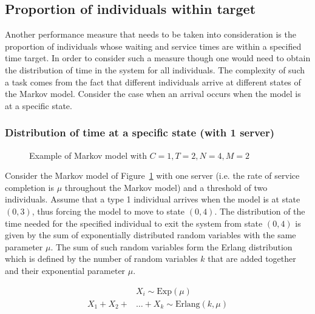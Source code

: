 \subsection{Proportion of individuals within target}
\label{sec:proportion_of_individuals_within_time}

Another performance measure that needs to be taken into consideration is the
proportion of individuals whose waiting and service times are within a
specified time target.
In order to consider such a measure though one would need to obtain the
distribution of time in the system for all individuals.
The complexity of such a task comes from the fact that different individuals
arrive at different states of the Markov model.
Consider the case when an arrival occurs when the model is at a specific state.

\subsubsection{Distribution of time at a specific state (with 1 server)}

\begin{figure}[H]
    \centering
    \scalebox{0.75}{}
    \caption{Example of Markov model with \(C=1, T=2, N=4, M=2\)}
    \label{fig:distribution_of_time_at_specific_state_1_server}
\end{figure}

Consider the Markov model of
Figure~\ref{fig:distribution_of_time_at_specific_state_1_server}
with one server (i.e.
the rate of service completion is \(\mu\) throughout the Markov model)
and a threshold of two individuals.
Assume that a type 1 individual arrives when the model is at state
\((0,3)\), thus forcing the model to move to state \((0,4)\).
The distribution of the time needed for the specified individual to exit the
system from state \((0,4)\) is given by the sum of exponentially distributed
random variables with the same parameter \(\mu\).
The sum of such random variables form the Erlang distribution which is defined
by the number of random variables \(k\) that are added together and their
exponential parameter \(\mu\).

\begin{align}
    & X_i \sim \text{Exp}(\mu) \nonumber \\
    X_1 + X_2 + & \dots + X_k \sim \text{Erlang}(k,\mu)
    \label{eq:erlang_distribution_definition}
\end{align}

